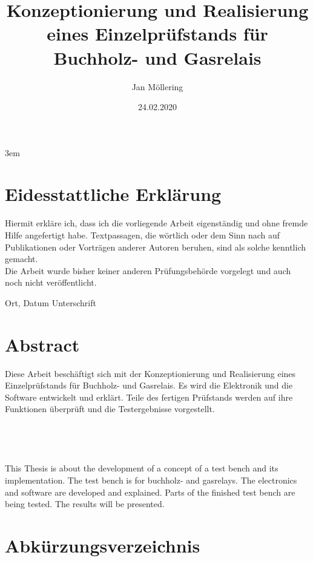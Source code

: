 \documentclass[12pt,a4paper,twoside]{report}
\title{Konzeptionierung und Realisierung eines Einzelprüfstands für Buchholz- und Gasrelais}
\author{Jan Möllering}
\date{24.02.2020}
\begin{document}
\emergencystretch 3em



\chapter*{Eidesstattliche Erklärung}
\thispagestyle{empty}
Hiermit erkläre ich, dass ich die vorliegende Arbeit eigenständig und ohne fremde Hilfe angefertigt habe. Textpassagen, die wörtlich oder dem Sinn nach auf Publikationen oder Vorträgen anderer Autoren beruhen, sind als solche kenntlich gemacht.
\\
\noindent
Die Arbeit wurde bisher keiner anderen Prüfungsbehörde vorgelegt und auch noch nicht veröffentlicht.

\vspace{4cm}

\hspace{2cm} Ort, Datum \hfill Unterschrift \hspace{2cm}

\chapter*{Abstract}
\thispagestyle{empty}
Diese Arbeit beschäftigt sich mit der Konzeptionierung und Realisierung eines Einzelprüfstands für Buchholz- und Gasrelais. Es wird die Elektronik und die Software entwickelt und erklärt. Teile des fertigen Prüfstands werden auf ihre Funktionen überprüft und die Testergebnisse vorgestellt.
\\
\\
\\
\\
\\
This Thesis is about the development of a concept of a test bench and its implementation. The test bench is for buchholz- and gasrelays. The electronics and software are developed and explained. Parts of the finished test bench are being tested. The results will be presented.

\setcounter{tocdepth}{2}
\tableofcontents
\thispagestyle{empty}
\newpage
{}


\listoftables
\newpage

\listoffigures

\chapter*{Abkürzungsverzeichnis}

\newpage
\end{document}
